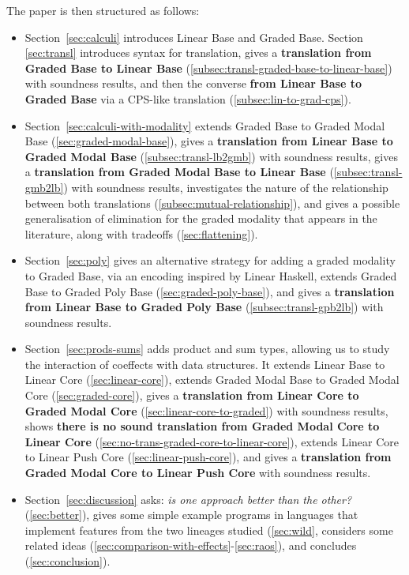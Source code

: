 The paper is then structured as follows:

\begin{itemize}
\item
Section~\ref{sec:calculi} introduces Linear Base and Graded Base. Section \ref{sec:transl}
introduces syntax for translation, gives a \textbf{translation from Graded Base to Linear Base}
(\ref{subsec:transl-graded-base-to-linear-base}) with soundness results, and then
the converse \textbf{from Linear Base to Graded Base} via a CPS-like translation
(\ref{subsec:lin-to-grad-cps}).

\item Section~\ref{sec:calculi-with-modality} extends Graded Base to Graded Modal Base
(\ref{sec:graded-modal-base}), gives a \textbf{translation from Linear Base to Graded Modal Base}
(\ref{subsec:transl-lb2gmb}) with soundness results, gives a \textbf{translation from Graded Modal
Base to Linear Base} (\ref{subsec:transl-gmb2lb}) with soundness results, investigates the nature of
the relationship between both translations (\ref{subsec:mutual-relationship}), and gives a possible
generalisation of elimination for the graded modality that appears in the literature, along with tradeoffs
(\ref{sec:flattening}).

\item
Section~\ref{sec:poly} gives an alternative strategy for adding a graded modality to Graded Base,
via an encoding inspired by Linear Haskell, extends Graded Base to Graded Poly Base
(\ref{sec:graded-poly-base}), and gives a \textbf{translation from Linear Base to Graded Poly Base}
(\ref{subsec:transl-gpb2lb}) with soundness results.

\item
Section~\ref{sec:prods-sums} adds product and sum types, allowing us to study the interaction of
coeffects with data structures. It extends Linear Base to Linear Core (\ref{sec:linear-core}), extends
Graded Modal Base to Graded Modal Core (\ref{sec:graded-core}), gives a \textbf{translation from
Linear Core to Graded Modal Core} (\ref{sec:linear-core-to-graded}) with soundness results, shows
\textbf{there is no sound translation from Graded Modal Core to Linear Core}
(\ref{sec:no-trans-graded-core-to-linear-core}), extends Linear Core to Linear Push Core
(\ref{sec:linear-push-core}), and gives a \textbf{translation from Graded Modal
Core to Linear Push Core} with soundness results.

\item
Section~\ref{sec:discussion} asks: \textit{is one approach better than the other?}
(\ref{sec:better}), gives some simple example programs in languages that implement features from the
two lineages studied (\ref{sec:wild}, considers some related ideas (\ref{sec:comparison-with-effects}-\ref{sec:raos}), and concludes (\ref{sec:conclusion}).
\end{itemize}
%
